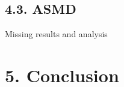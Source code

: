 \documentclass[
  journal=usp, %
  manuscript=final-report,
  year=2023,
  volume=1,
]{cup-journal}
\begin{document}












\subsection{4.3. ASMD}

Missing results and analysis






\section{5. Conclusion}
\end{document}
